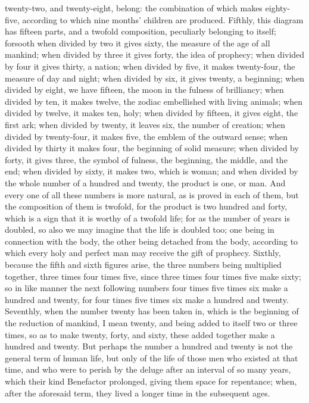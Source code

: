 twenty-two, and twenty-eight, belong: the combination of which makes eighty-five, according to
which nine months' children are produced. Fifthly, this diagram has fifteen parts, and a twofold
composition, peculiarly belonging to itself; forsooth when divided by two it gives sixty, the measure
of the age of all mankind; when divided by three it gives forty, the idea of prophecy; when divided by
four it gives thirty, a nation; when divided by five, it makes twenty-four, the measure of day and
night; when divided by six, it gives twenty, a beginning; when divided by eight, we have fifteen, the
moon in the fulness of brilliancy; when divided by ten, it makes twelve, the zodiac embellished with
living animals; when divided by twelve, it makes ten, holy; when divided by fifteen, it gives eight, the
first ark; when divided by twenty, it leaves six, the number of creation; when divided by twenty-four,
it makes five, the emblem of the outward sense; when divided by thirty it makes four, the beginning
of solid measure; when divided by forty, it gives three, the symbol of fulness, the beginning, the
middle, and the end; when divided by sixty, it makes two, which is woman; and when divided by the
whole number of a hundred and twenty, the product is one, or man. And every one of all these
numbers is more natural, as is proved in each of them, but the composition of them is twofold, for
the product is two hundred and forty, which is a sign that it is worthy of a twofold life; for as the
number of years is doubled, so also we may imagine that the life is doubled too; one being in
connection with the body, the other being detached from the body, according to which every holy
and perfect man may receive the gift of prophecy. Sixthly, because the fifth and sixth figures arise,
the three numbers being multiplied together, three times four times five, since three times four
times five make sixty; so in like manner the next following numbers four times five times six make a
hundred and twenty, for four times five times six make a hundred and twenty. Seventhly, when the
number twenty has been taken in, which is the beginning of the reduction of mankind, I mean
twenty, and being added to itself two or three times, so as to make twenty, forty, and sixty, these
added together make a hundred and twenty. But perhaps the number a hundred and twenty is not
the general term of human life, but only of the life of those men who existed at that time, and who
were to perish by the deluge after an interval of so many years, which their kind Benefactor
prolonged, giving them space for repentance; when, after the aforesaid term, they lived a longer
time in the subsequent ages.


